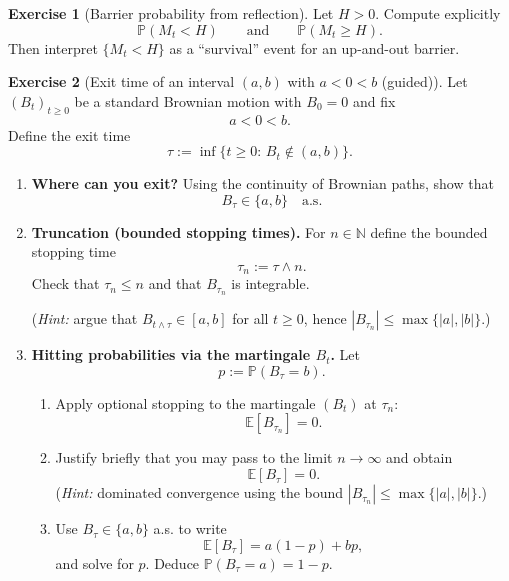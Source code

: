 \documentclass[11pt]{article}
\newcommand{\E}{\mathbb{E}}
\newcommand{\1}{\mathbf{1}}
\theoremstyle{definition}
\newtheorem{exercise}{Exercise}[section]
\begin{document}
\begin{exercise}[Barrier probability from reflection]
Let $H>0$. Compute explicitly
$$
\mathbb{P}(M_t < H)\qquad\text{and}\qquad \mathbb{P}(M_t \ge H).
$$
Then interpret $\{M_t<H\}$ as a “survival” event for an up-and-out barrier.
\end{exercise}

\begin{exercise}[Exit time of an interval $(a,b)$ with $a<0<b$ (guided)]
Let $(B_t)_{t\ge 0}$ be a standard Brownian motion with $B_0=0$ and fix
$$
a<0<b.
$$
Define the exit time
$$
\tau:=\inf\{t\ge 0:\, B_t\notin(a,b)\}.
$$

\begin{enumerate}[label=\textbf{(\alph*)}, itemsep=0.35em]

\item \textbf{Where can you exit?}
Using the continuity of Brownian paths, show that
$$
B_\tau \in \{a,b\}\quad\text{a.s.}
$$

\item \textbf{Truncation (bounded stopping times).}
For $n\in\mathbb{N}$ define the bounded stopping time
$$
\tau_n:=\tau\wedge n.
$$
Check that $\tau_n\le n$ and that $B_{\tau_n}$ is integrable.

(\emph{Hint:} argue that $B_{t\wedge\tau}\in[a,b]$ for all $t\ge 0$, hence $|B_{\tau_n}|\le \max\{|a|,|b|\}$.)

\item \textbf{Hitting probabilities via the martingale $B_t$.}
Let
$$
p:=\mathbb{P}(B_\tau=b).
$$
\begin{enumerate}[label=\roman*)]
\item Apply optional stopping to the martingale $(B_t)$ at $\tau_n$:
$$
\E[B_{\tau_n}]=0.
$$
\item Justify briefly that you may pass to the limit $n\to\infty$ and obtain
$$
\E[B_\tau]=0.
$$
(\emph{Hint:} dominated convergence using the bound $|B_{\tau_n}|\le \max\{|a|,|b|\}$.)
\item Use $B_\tau\in\{a,b\}$ a.s. to write
$$
\E[B_\tau]=a(1-p)+bp,
$$
and solve for $p$. Deduce $\mathbb{P}(B_\tau=a)=1-p$.
\end{enumerate}


\end{enumerate}
\end{exercise}
\end{document}
